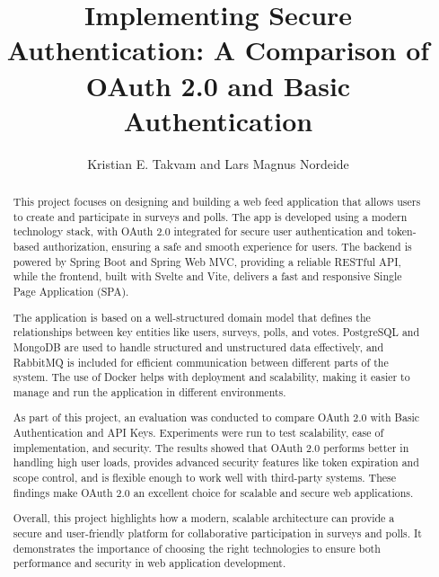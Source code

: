 \documentclass[11pt]{article}
\begin{document}
\title{Implementing Secure Authentication: A Comparison of OAuth 2.0 and Basic Authentication}

\author{Kristian E. Takvam and Lars Magnus Nordeide}

\maketitle

\begin{abstract}
This project focuses on designing and building a web feed application that allows users to create and participate in surveys and polls. The app is developed using a modern technology stack, with OAuth 2.0 integrated for secure user authentication and token-based authorization, ensuring a safe and smooth experience for users. The backend is powered by Spring Boot and Spring Web MVC, providing a reliable RESTful API, while the frontend, built with Svelte and Vite, delivers a fast and responsive Single Page Application (SPA).

The application is based on a well-structured domain model that defines the relationships between key entities like users, surveys, polls, and votes. PostgreSQL and MongoDB are used to handle structured and unstructured data effectively, and RabbitMQ is included for efficient communication between different parts of the system. The use of Docker helps with deployment and scalability, making it easier to manage and run the application in different environments.

As part of this project, an evaluation was conducted to compare OAuth 2.0 with Basic Authentication and API Keys. Experiments were run to test scalability, ease of implementation, and security. The results showed that OAuth 2.0 performs better in handling high user loads, provides advanced security features like token expiration and scope control, and is flexible enough to work well with third-party systems. These findings make OAuth 2.0 an excellent choice for scalable and secure web applications.

Overall, this project highlights how a modern, scalable architecture can provide a secure and user-friendly platform for collaborative participation in surveys and polls. It demonstrates the importance of choosing the right technologies to ensure both performance and security in web application development.

\end{abstract}

%














{}
\end{document}
